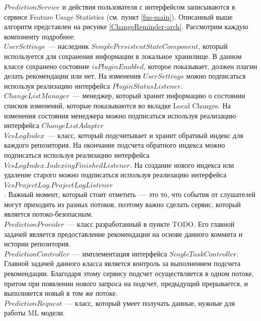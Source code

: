     
$PredictionService$ и действия пользователя с интерфейсом записываются в сервисе Feature Usage Statistics (см. пункт \ref{fus-main}). Описанный выше алгоритм представлен на рисунке \ref{ChangeReminder-arch}. Рассмотрим каждую компоненту подробнее:\\


$UserSettings$~--- наследник $SimplePersistentStateComponent$, который используется для сохранения информации в локальное хранилище. В данном классе сохранено состояние $isPluginEnabled$, которое показывает, должен плагин делать рекомендации или нет. На изменения $UserSettings$ можно подписаться используя реализацию интерфейса $PluginStatusListener$.\\


$ChangeListManager$~--- менеджер, который хранит информацию о состоянии списков изменений, которые показываются во вкладке Local Changes. На изменения состояния менеджера можно подписаться используя реализацию интерфейса $ChangeListAdapter$\\


$VcsLogIndex$~--- класс, который подсчитывает и хранит обратный индекс для каждого репозитория. На окончание подсчета обратного индекса можно подписаться используя реализацию интерфейса $VcsLogIndex.IndexingFinishedListener$. На создание нового индекса или удаление старого можно подписаться используя реализацию интерфейса $VcsProjectLog.ProjectLogListener$\\. Важный момент, который стоит отметить~--- это то, что события от слушателей могут приходить из разных потоков, поэтому важно сделать сервис, который является потоко-безопасным.\\


$PredictionProvider$~--- класс разработанный в пункте TODO. Его главной задачей является предоставление рекомендации на основе данного коммита и истории репозитория.\\


$PredictionController$~--- имплементация интерфейса $SingleTaskController$. Главной задачей данного класса является контроль за выполнением подсчета рекомендации. Благодаря этому сервису подсчет осуществляется в одном потоке, притом при появлении нового запроса на подсчет, предыдущий прерывается, и выполняется новый в том же потоке.\\


$PredictionRequest$~--- класс, который умеет получать данные, нужные для работы ML модели. \\


